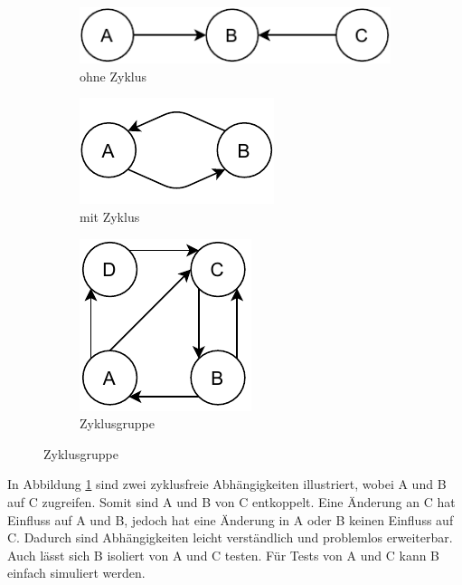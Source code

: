 \begin{figure}[H]
    \centering
    \caption{Beispiele für Abhängigkeiten basierend auf Lilienthal}
    \label{fig:exampleCircular}
    \begin{subfigure}[b]{.3\textwidth}
        \centering
        \includegraphics[width=.9\textwidth]{diagrams/Methoden/Circular-Example-C.pdf}
        \caption{ohne Zyklus}
        \label{fig:circularA}
    \end{subfigure}
    \begin{subfigure}[b]{.3\textwidth}
        \centering
        \includegraphics[width=.6\textwidth]{diagrams/Methoden/Circular-Example-A.pdf}
        \caption{mit Zyklus}
        \label{fig:circularB}
    \end{subfigure}
    \begin{subfigure}[b]{.3\textwidth}
        \centering
        \includegraphics[width=.5\textwidth]{diagrams/Methoden/Circular-Example-B.pdf}
        \caption{Zyklusgruppe}
        \label{fig:circularC}
    \end{subfigure}
\end{figure}
In Abbildung \ref{fig:circularA} sind zwei zyklusfreie Abhängigkeiten illustriert, wobei A und B auf C zugreifen. Somit sind A und B von C entkoppelt. Eine Änderung an C hat Einfluss auf A und B, jedoch hat eine Änderung in A oder B keinen Einfluss auf C. Dadurch sind Abhängigkeiten leicht verständlich und problemlos erweiterbar. 
Auch lässt sich B isoliert von A und C testen. Für Tests von A und C kann B einfach simuliert werden.

